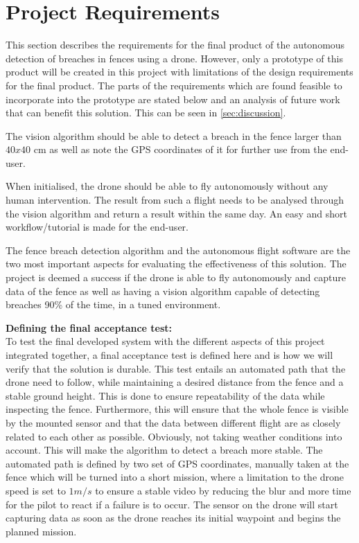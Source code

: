 \documentclass[../Head/Main.tex]{subfiles}
\begin{document}
\section{Project Requirements}
\label{subsec:req_UAS}
This section describes the requirements for the final product of the autonomous detection of breaches in fences using a drone. However, only a prototype of this product will be created in this project with limitations of the design requirements for the final product. The parts of the requirements which are found feasible to incorporate into the prototype are stated below and an analysis of future work that can benefit this solution. This can be seen in \autoref{sec:discussion}.

\par
The vision algorithm should be able to detect a breach in the fence larger than $40x40$ cm as well as note the GPS coordinates of it for further use from the end-user.

When initialised, the drone should be able to fly autonomously without any human intervention. The result from such a flight needs to be analysed through the vision algorithm and return a result within the same day. An easy and short workflow/tutorial is made for the end-user.

\par
The fence breach detection algorithm and the autonomous flight software are the two most important aspects for evaluating the effectiveness of this solution. The project is deemed a success if the drone is able to fly autonomously and capture data of the fence as well as having a vision algorithm capable of detecting breaches 90\% of the time, in a tuned environment. 

\par
\textbf{Defining the final acceptance test:}\\
To test the final developed system with the different aspects of this project integrated together, a final acceptance test is defined here and is how we will verify that the solution is durable. This test entails an automated path that the drone need to follow, while maintaining a desired distance from the fence and a stable ground height. This is done to ensure repeatability of the data while inspecting the fence. Furthermore, this will ensure that the whole fence is visible by the mounted sensor and that the data between different flight are as closely related to each other as possible. Obviously, not taking weather conditions into account. This will make the algorithm to detect a breach more stable. The automated path is defined by two set of GPS coordinates, manually taken at the fence which will be turned into a short mission, where a limitation to the drone speed is set to $1 m/s$ to ensure a stable video by reducing the blur and more time for the pilot to react if a failure is to occur.   
The sensor on the drone will start capturing data as soon as the drone reaches its initial waypoint and begins the planned mission.  
\end{document}
